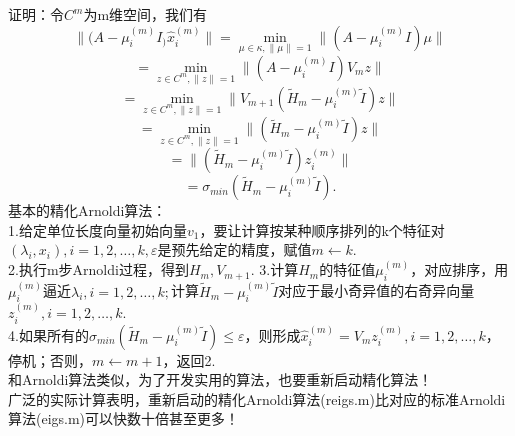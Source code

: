 \documentclass[a4paper,12pt]{article}
\begin{document}
\begin{CJK*}{UTF8}{gbsn}
	证明：令$C^m$为m维空间，我们有
	$$\|(A-\mu_i^{(m)}I_)\hat{x}_i^{(m)}\|=\min_{\mu\in\kappa,\|\mu\|=1}\|(A-\mu_i^{(m)}I)\mu\|$$
	$$=\min_{z\in C^m,\|z\|=1}\|(A-\mu_i^{(m)}I)V_mz\|$$
	$$=\min_{z \in C^m,\|z\|=1}\|V_{m+1}(\tilde{H}_m - \mu_i^{(m)}\tilde{I})z\|$$
	$$= \min_{z \in C^m,\|z\|=1}\|(\tilde{H}_m - \mu_i^{(m)}\tilde{I})z\|$$
	$$= \|(\tilde{H}_m - \mu_i^{(m)}\tilde{I})z_i^{(m)}\|$$
	$$= \sigma_{min}(\tilde{H}_m - \mu_i^{(m)}\tilde{I}).$$
	基本的精化Arnoldi算法：\\
	1.给定单位长度向量初始向量$v_1$，要让计算按某种顺序排列的k个特征对$(\lambda_i,x_i),i=1,2,\ldots,k,\varepsilon$是预先给定的精度，赋值$m\leftarrow k$.\\
	2.执行m步Arnoldi过程，得到$H_m,V_{m+1}$.
	3.计算$H_m$的特征值$\mu_i^{(m)}$，对应排序，用$\mu_i^{(m)}$逼近$\lambda_i, i=1,2,\ldots,k;$计算$\tilde{H}_m - \mu_i^{(m)}\tilde{I}$对应于最小奇异值的右奇异向量$z_i^{(m)},i=1,2,\ldots,k.$\\
	4.如果所有的$\sigma_{min}(\tilde{H}_m - \mu_i^{(m)}\tilde{I}) \le \varepsilon$，则形成$\hat{x}_i^{(m)}=V_mz_i^{(m)},i=1,2,\ldots,k$，停机；否则，$m\leftarrow m+1$，返回2.\\
	和Arnoldi算法类似，为了开发实用的算法，也要重新启动精化算法！\\
	广泛的实际计算表明，重新启动的精化Arnoldi算法(reigs.m)比对应的标准Arnoldi算法(eigs.m)可以快数十倍甚至更多！\\

\end{CJK*}
\end{document}
